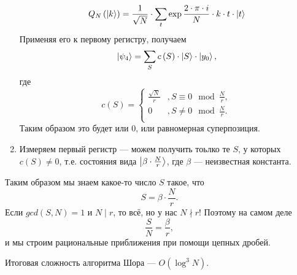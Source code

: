 \begin{enumerate}
\begin{equation*}
      Q_N\left( \left| k \right> \right) = \frac{1}{\sqrt{N}} \cdot \sum_{t} \exp{\frac{2 \cdot \pi \cdot i}{N} \cdot k \cdot t} \cdot \left| t \right>
    \end{equation*}
    Применяя его к первому регистру, получаем
    \begin{equation*}
      \left| \psi_4 \right> = \sum_{S} c\left( S \right) \cdot \left| S \right> \cdot \left| y_0 \right>,
    \end{equation*}
    где
    \begin{equation*}
      c\left( S \right) =
      \begin{cases}
        \frac{\sqrt{N}}{r} &, S \equiv 0 \mod \frac{N}{r}, \\
        0 &, S \neq 0 \mod \frac{N}{r}. \\
      \end{cases}
    \end{equation*}
    Таким образом это будет или $0$, или равномерная суперпозиция.
  \item Измеряем первый регистр --- можем получить тоьлко те $S$, у которых
    $c\left( S \right) \neq 0$, т.е. состояния вида $\left| \beta \cdot \frac{N}{r} \right>$, где $\beta$ --- неизвестная константа.
\end{enumerate}

Таким образом мы знаем какое-то число $S$ такое, что
\begin{equation*}
  S = \beta \cdot \frac{N}{r}.
\end{equation*}
Если $gcd\left( S, N \right) = 1$ и $N \mid r$, то всё, но у нас
$N \nmid r$! Поэтому на самом деле
\begin{equation*}
  \frac{S}{N} = \frac{\beta}{r},
\end{equation*}
и мы строим рациональные приближения при помощи цепных дробей.

Итоговая сложность алгоритма Шора --- $O\left( \log^3 N \right)$.
